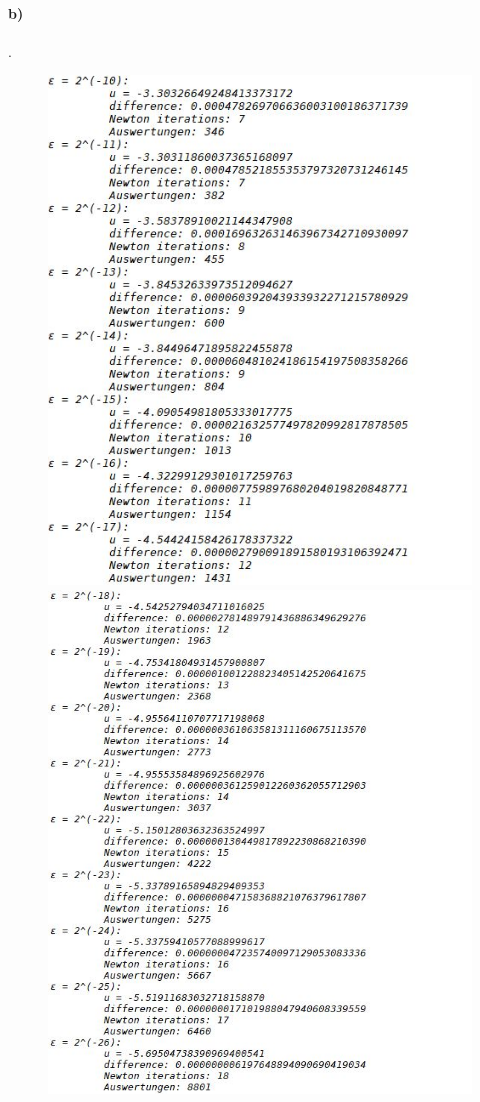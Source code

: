 \documentclass{article}
\begin{document}
		\paragraph*{b)}.
			\begin{figure}[h!]
				\includegraphics[scale=0.7]{bpart1.jpg}
				\includegraphics[scale=0.7]{bpart2.jpg}
			\end{figure}
\end{document}
